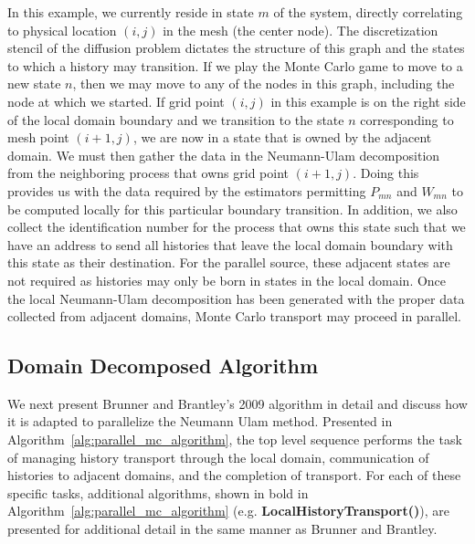 In this example, we currently reside in state $m$ of the system,
directly correlating to physical location $(i,j)$ in the mesh (the
center node). The discretization stencil of the diffusion problem
dictates the structure of this graph and the states to which a history
may transition. If we play the Monte Carlo game to move to a new state
$n$, then we may move to any of the nodes in this graph, including the
node at which we started. If grid point $(i,j)$ in this example is on
the right side of the local domain boundary and we transition to the
state $n$ corresponding to mesh point $(i+1,j)$, we are now in a state
that is owned by the adjacent domain. We must then gather the data in
the Neumann-Ulam decomposition from the neighboring process that owns
grid point $(i+1,j)$. Doing this provides us with the data required by
the estimators permitting $P_{mn}$ and $W_{mn}$ to be computed locally
for this particular boundary transition. In addition, we also collect
the identification number for the process that owns this state such
that we have an address to send all histories that leave the local
domain boundary with this state as their destination. For the parallel
source, these adjacent states are not required as histories may only
be born in states in the local domain. Once the local Neumann-Ulam
decomposition has been generated with the proper data collected from
adjacent domains, Monte Carlo transport may proceed in parallel.

\subsection{Domain Decomposed Algorithm}
\label{subsec:parallel_mc_algorithm}

We next present Brunner and Brantley's 2009 algorithm in detail and
discuss how it is adapted to parallelize the Neumann Ulam
method. Presented in Algorithm~\ref{alg:parallel_mc_algorithm}, the
top level sequence performs the task of managing history transport
through the local domain, communication of histories to adjacent
domains, and the completion of transport. For each of these specific
tasks, additional algorithms, shown in bold in
Algorithm~\ref{alg:parallel_mc_algorithm}
(e.g. \textbf{LocalHistoryTransport()}), are presented for additional
detail in the same manner as Brunner and Brantley.

